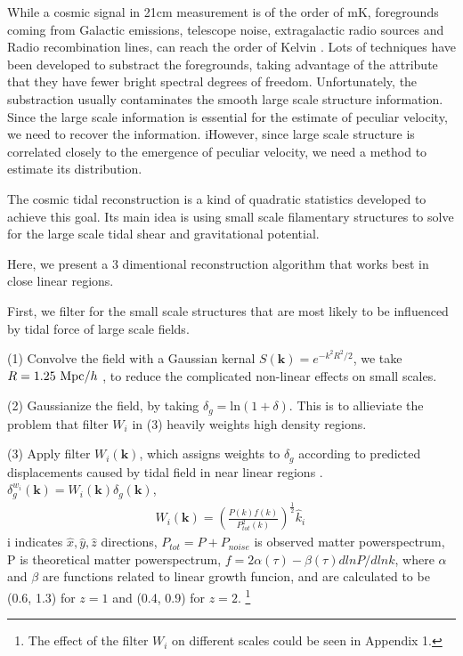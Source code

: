 While a cosmic signal in 21cm measurement is of the order of mK,  
foregrounds coming from Galactic emissions, telescope noise, 
extragalactic radio sources and Radio recombination lines, 
can reach the order of Kelvin \cite{DiMatteo04}\cite{Masui13}. 
Lots of techniques have been developed to substract the foregrounds, 
taking advantage of the attribute that they have fewer bright spectral
degrees of freedom\cite{Switzer15}.
Unfortunately, the substraction usually contaminates the smooth large scale structure information.
Since the large scale information is essential for the estimate of
peculiar velocity, we need to recover the information.
iHowever, since large scale structure is correlated closely to the emergence of peculiar velocity, we need a method to estimate its distribution.

The cosmic tidal reconstruction is a kind of quadratic statistics developed to achieve this goal.
Its main idea is using small scale filamentary structures to solve for the large scale tidal shear and gravitational potential.

Here, we present a 3 dimentional reconstruction algorithm that works best in close linear regions.

First, we filter for the small scale structures that are most likely to be influenced by tidal force of large scale fields.

(1) Convolve the field with a Gaussian kernal
$S(\bm{k})=e^{-k^2R^2/2}$, 
we take $R=1.25\ \mathrm{Mpc}/h$ \cite{2012:pen},
to reduce the complicated non-linear effects on small scales.

(2) Gaussianize the field, by taking 
$\delta_g=\mathrm{ln}(1+\delta)$. 
This is to allieviate the problem that filter $W_i$ in (3) heavily weights high density regions.

(3) Apply filter $W_i(\bm{k})$, which assigns weights to $\delta_g$ according to predicted displacements caused by tidal field in near linear regions \cite{2015:zhu}.
${\delta}^{w_i}_g(\bm{k})=W_i(\bm{k})\delta_g(\bm{k})$, 
\begin{eqnarray}
\label{eq:wi}
W_i(\bm{k})=(\frac{P(k)f(k)}{P_{tot}^2(k)})^{\frac{1}{2}}\hat{k}_i\,
\end{eqnarray}
i indicates $\hat x,\hat y,\hat z$ directions, 
$P_{tot}=P+P_{noise}$ is observed matter powerspectrum, 
P is theoretical matter powerspectrum,
$f=2\alpha(\tau)-\beta(\tau)dlnP/dlnk$, 
where $\alpha$ and $\beta$ are functions related to linear growth funcion, and are calculated to be (0.6, 1.3) for $z=1$ and (0.4, 0.9) for $z=2$.
\footnote{The effect of the filter $W_i$ on different scales could be seen in Appendix 1.}


